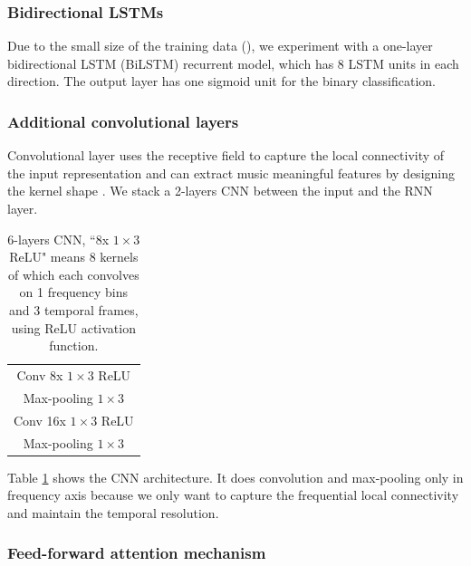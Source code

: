 \subsubsection{Bidirectional LSTMs}\label{sec:ch6:bilstm}

Due to the small size of the training data (), we experiment with a one-layer bidirectional LSTM (BiLSTM) recurrent model, which has 8 LSTM units in each direction. The output layer has one sigmoid unit for the binary classification.

\subsubsection{Additional convolutional layers}\label{sec:ch6:cnn}

Convolutional layer uses the receptive field to capture the local connectivity of the input representation and can extract music meaningful features by designing the kernel shape \cite{Pons2017Timbre}. We stack a 2-layers CNN between the input and the RNN layer.

\begin{table}[ht!]
\centering
\caption{6-layers CNN,  ``8x $1\times3$ ReLU" means 8 kernels of which each convolves on 1 frequency bins and 3 temporal frames, using ReLU activation function.}
\label{tab:ch6:cnn_mispronunciation}
\begin{tabular}{c}
\toprule
Conv 8x $1{\times}3$ ReLU\\
Max-pooling $1{\times}3$ \\
Conv 16x $1{\times}3$ ReLU\\
Max-pooling $1{\times}3$ \\
\bottomrule
\end{tabular}
\end{table}

Table \ref{tab:ch6:cnn_mispronunciation} shows the CNN architecture. It does convolution and max-pooling only in frequency axis because we only want to capture the frequential local connectivity and maintain the temporal resolution. 

\subsubsection{Feed-forward attention mechanism}\label{sec:ch6:feed_forward_att}

